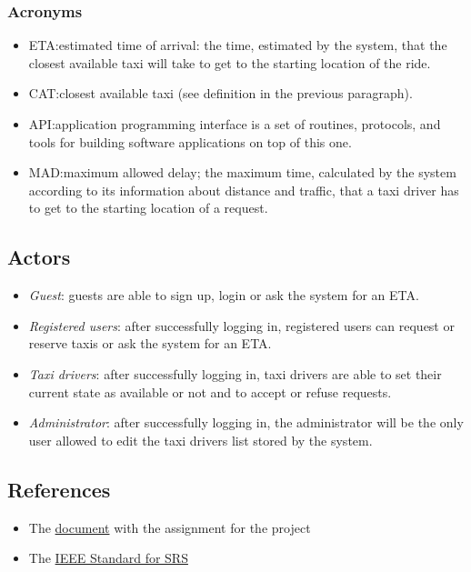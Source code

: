 \documentclass{article}
\begin{document}
\subsubsection{Acronyms}
\begin{itemize}
	\item ETA:\@ estimated time of arrival: the time, estimated by the system, that the closest available taxi will take to get to the starting location of the ride.
	\item CAT:\@ closest available taxi (see definition in the previous paragraph).
	\item API:\@ application programming interface is a set of routines, protocols, and tools for building software applications on top of this one.
	\item MAD:\@ maximum allowed delay; the maximum time, calculated by the system according to its information about distance and traffic, that a taxi driver has to get to the starting location of a request. %
\end{itemize}
\subsection{Actors}
\begin{itemize}
	\item \textit{Guest}: guests are able to sign up, login or ask the system for an ETA.\@
	\item \textit{Registered users}: after successfully logging in, registered users can request or reserve taxis or ask the system for an ETA.\@
	\item \textit{Taxi drivers}: after successfully logging in, taxi drivers are able to set their current state as available or not and to accept or refuse requests.
	\item \textit{Administrator}: after successfully logging in, the administrator will be the only user allowed to edit the taxi drivers list stored by the system.
\end{itemize}

\subsection{References}
\begin{itemize}
	\item The \href{run:./external_references/assignments.pdf}{document} with the assignment for the project
	\item The \href{run:./external_references/assignments.pdf}{IEEE Standard for SRS } 
\end{itemize}
\end{document}
